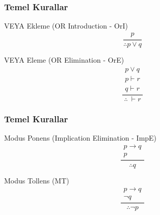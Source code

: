 \documentclass[dvipsnames]{beamer}
\theoremstyle{definition}
\theoremstyle{example}
\theoremstyle{plain}
\begin{document}
\begin{frame}
  \frametitle{Temel Kurallar}

  \begin{block}{VEYA Ekleme (OR Introduction - OrI)}
    \[
    \frac
      {
        \begin{array}{c}
          p
        \end{array}
      }
      {
        \therefore p \vee q
      }
    \]
  \end{block}

  \pause
  \begin{block}{VEYA Eleme (OR Elimination - OrE)}
  \[
  \frac
    {
      \begin{array}{c}
        p \vee q\\
        p \vdash r\\
        q \vdash r
      \end{array}
    }
    {
      \therefore ~ \vdash r
    }
  \]
  \end{block}
\end{frame}

\begin{frame}
  \frametitle{Temel Kurallar}

  \begin{block}{Modus Ponens (Implication Elimination - ImpE)}
    \[
    \frac
      {
        \begin{array}{c}
          p \rightarrow q\\
          p
        \end{array}
      }
      {
        \therefore q
      }
    \]
  \end{block}

  \pause
  \begin{block}{Modus Tollens (MT)}
    \[
    \frac
      {
        \begin{array}{c}
          p \rightarrow q\\
          \neg q
        \end{array}
      }
      {
        \therefore \neg p
      }
    \]
  \end{block}
\end{frame}
\end{document}
